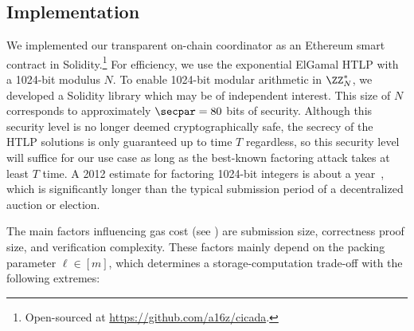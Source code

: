\subsection{Implementation}\label{sec:implementation} 


We implemented our transparent on-chain coordinator as an Ethereum smart contract in Solidity.\footnote{Open-sourced at \url{https://github.com/a16z/cicada}.} 
For efficiency, we use the exponential ElGamal HTLP with a 1024-bit modulus $N$.
To enable 1024-bit modular arithmetic in $\ZZ_N^*$, we developed a Solidity library which may be of independent interest. 
This size of $N$ corresponds to approximately $\secpar=80$ bits of security.
Although this security level is no longer deemed cryptographically safe, the secrecy of the HTLP solutions is only guaranteed up to time $T$ regardless, so this security level will suffice for our use case as long as the best-known factoring attack takes at least $T$ time. A 2012 estimate for factoring 1024-bit integers is about a year~\cite{facthacks}, which is significantly longer than the typical submission period of a decentralized auction or election.

The main factors influencing gas cost (see ) are submission size, correctness proof size, and verification complexity. These factors mainly depend on the packing parameter $\ell\in[m]$, which determines a storage-computation trade-off with the following extremes:

